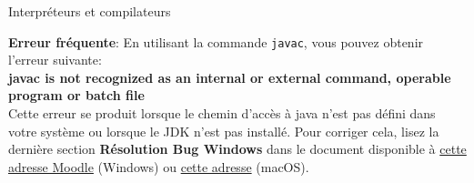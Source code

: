 \begin{section}{Interpréteurs et compilateurs}
\begin{Exercice}[10 minutes]
\begin{solution}
            \textbf{Erreur fréquente}: En utilisant la commande \lstinline{javac}, vous pouvez obtenir l'erreur suivante:\\
            \textbf{javac is not recognized as an internal or external command, operable program or batch file}\\
            Cette erreur se produit lorsque le chemin d'accès à java n'est pas défini dans votre système ou lorsque le JDK n'est pas installé. Pour corriger cela, lisez la dernière section \textbf{Résolution Bug Windows} dans le document disponible à \href{https://moodle.unil.ch/mod/resource/view.php?id=2218867}{cette adresse Moodle} (Windows) ou \href{https://moodle.unil.ch/mod/resource/view.php?id=2218868}{cette adresse} (macOS).

        \end{solution}

    \end{Exercice}
    
\end{section}
